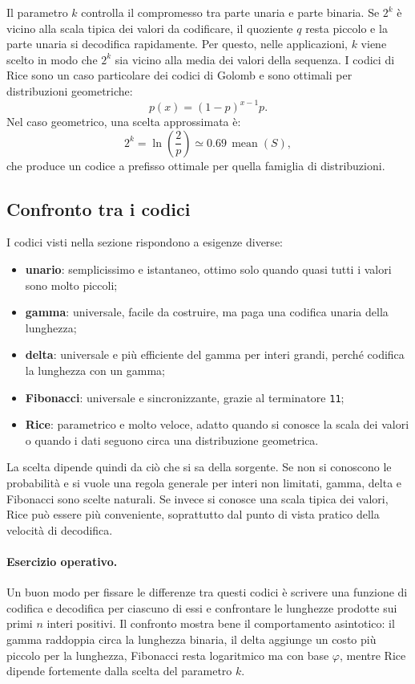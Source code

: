 \documentclass{article}
\theoremstyle{definition}
\numberwithin{equation}{section}
\begin{document}
Il parametro $k$ controlla il compromesso tra parte unaria e parte binaria. Se $2^k$ è vicino alla scala tipica dei valori da codificare, il quoziente $q$ resta piccolo e la parte unaria si decodifica rapidamente. Per questo, nelle applicazioni, $k$ viene scelto in modo che $2^k$ sia vicino alla media dei valori della sequenza. I codici di Rice sono un caso particolare dei codici di Golomb e sono ottimali per distribuzioni geometriche:
\[
    p(x)=(1-p)^{x-1}p.
\]
Nel caso geometrico, una scelta approssimata è:
\[
    2^k=\ln\left(\frac{2}{p}\right)\simeq 0.69\,\operatorname{mean}(S),
\]
che produce un codice a prefisso ottimale per quella famiglia di distribuzioni.

\subsection{Confronto tra i codici}
I codici visti nella sezione rispondono a esigenze diverse:
\begin{itemize}
    \item \textbf{unario}: semplicissimo e istantaneo, ottimo solo quando quasi tutti i valori sono molto piccoli;
    \item \textbf{gamma}: universale, facile da costruire, ma paga una codifica unaria della lunghezza;
    \item \textbf{delta}: universale e più efficiente del gamma per interi grandi, perché codifica la lunghezza con un gamma;
    \item \textbf{Fibonacci}: universale e sincronizzante, grazie al terminatore \texttt{11};
    \item \textbf{Rice}: parametrico e molto veloce, adatto quando si conosce la scala dei valori o quando i dati seguono circa una distribuzione geometrica.
\end{itemize}

La scelta dipende quindi da ciò che si sa della sorgente. Se non si conoscono le probabilità e si vuole una regola generale per interi non limitati, gamma, delta e Fibonacci sono scelte naturali. Se invece si conosce una scala tipica dei valori, Rice può essere più conveniente, soprattutto dal punto di vista pratico della velocità di decodifica.

\paragraph{Esercizio operativo.}
Un buon modo per fissare le differenze tra questi codici è scrivere una funzione di codifica e decodifica per ciascuno di essi e confrontare le lunghezze prodotte sui primi $n$ interi positivi. Il confronto mostra bene il comportamento asintotico: il gamma raddoppia circa la lunghezza binaria, il delta aggiunge un costo più piccolo per la lunghezza, Fibonacci resta logaritmico ma con base $\varphi$, mentre Rice dipende fortemente dalla scelta del parametro $k$.
\end{document}
